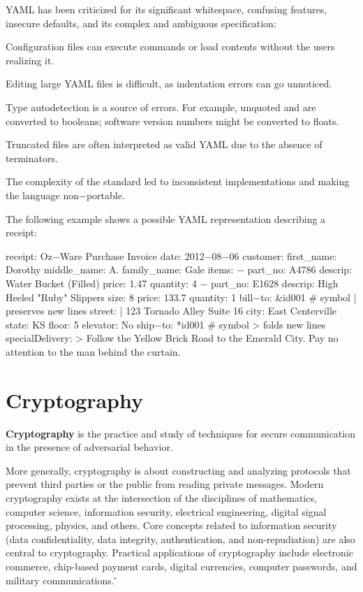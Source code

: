 YAML has been criticized for its significant whitespace, confusing features, insecure defaults, and its complex and
ambiguous specification:
\bit
\item Configuration files can execute commands or load contents without the users realizing it.
\item Editing large YAML files is difficult, as indentation errors can go unnoticed.
\item Type autodetection is a source of errors. For example, unquoted  and  are converted to
booleans; software version numbers might be converted to floats.
\item Truncated files are often interpreted as valid YAML due to the absence of terminators.
\item The complexity of the standard led to inconsistent implementations and making the language non$-$portable.
\eit

The following example shows a possible YAML representation describing a receipt:

\begin{block}
receipt: Oz$-$Ware Purchase Invoice
date: 2012$-$08$-$06
customer:
    first_name: Dorothy
    middle_name: A.
    family_name: Gale
items:
    $-$ part_no: A4786
      descrip: Water Bucket (Filled)
      price: 1.47
      quantity: 4
    $-$ part_no: E1628
      descrip: High Heeled "Ruby" Slippers
      size: 8
      price: 133.7
      quantity: 1
bill$-$to:  &id001
    # symbol | preserves new lines
    street: |
            123 Tornado Alley
            Suite 16
    city: East Centerville
    state: KS
    floor: 5
    elevator: No
ship$-$to:  *id001
# symbol > folds new lines
specialDelivery:  >
    Follow the Yellow Brick
    Road to the Emerald City.
    Pay no attention to the
    man behind the curtain.
\end{block}

\section{Cryptography}

\bd[Cryptography]
\textbf{Cryptography} is the practice and study of techniques for secure communication in the presence of adversarial
behavior.
\ed

More generally, cryptography is about constructing and analyzing protocols that prevent third parties or the public
from reading private messages. Modern cryptography exists at the intersection of the disciplines of mathematics,
computer science, information security, electrical engineering, digital signal processing, physics, and others. Core
concepts related to information security (data confidentiality, data integrity, authentication, and non-repudiation)
are also central to cryptography. Practical applications of cryptography include electronic commerce, chip-based
payment cards, digital currencies, computer passwords, and military communications. \v

